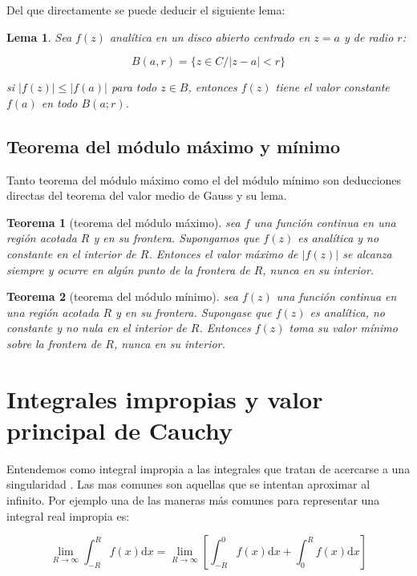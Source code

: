 \documentclass[12pt,a4paper]{book}
\newcommand{\ccorchetes}[1]{\left[ #1  \right]}
\newcommand{\D}{\mathrm{d}}
\newtheorem{theorem}{Teorema}[section]
\newtheorem{lemma}{Lema}[section]
\begin{document}
Del que directamente se puede deducir el siguiente lema:

\begin{lemma}
Sea $f(z)$ analítica en un disco abierto centrado en $z=a$ y de radio $r$: 

$$ B(a,r) = \{ z \in C / |z-a|<r \} $$

si $|f(z)|\leq|f(a)|$ para todo $z \in B$, entonces $f(z)$ tiene el valor constante $f(a)$ en todo $B(a;r)$.
\end{lemma}

\subsection{Teorema del módulo máximo y mínimo}

Tanto teorema del módulo máximo como el del módulo mínimo son deducciones directas del teorema del valor medio de Gauss y su lema.
 
\begin{theorem}[teorema del módulo máximo]
sea $f$ una función continua en una  región acotada $R$ y en su frontera. Supongamos que $f(z)$ es analítica y no constante en el interior de $R$. Entonces el valor máximo de  $|f(z)|$ se alcanza siempre y ocurre en algún punto de la frontera de $R$, nunca en su interior.
\end{theorem}

\begin{theorem}[teorema del módulo mínimo]
sea $f(z)$ una función continua en una región acotada $R$ y en su frontera. Supongase que $f(z)$ es analítica, no constante y no nula en el interior de $R$. Entonces $f(z)$ toma su valor mínimo sobre la frontera de $R$, nunca en su interior.
\end{theorem}

\section{Integrales impropias y valor principal de Cauchy}

Entendemos como integral impropia a las integrales que tratan de acercarse a una singularidad . Las mas comunes son aquellas que se intentan aproximar al infinito. Por ejemplo una de las maneras más comunes para representar una integral real impropia es:

\begin{equation}
\lim_{R \rightarrow \infty} \int_{-R}^R f(x) \D x = \lim_{R \rightarrow \infty} \ccorchetes{\int_{-R}^0 f(x) \D x + \int_0^R f(x) \D x }
\end{equation}
\end{document}
